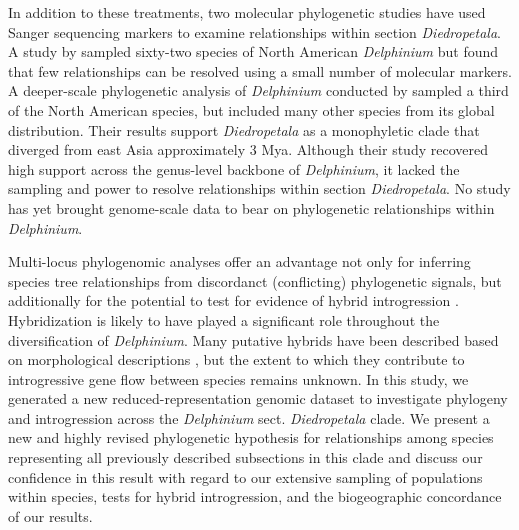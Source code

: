 \documentclass[11pt]{article}
\begin{document}
In addition to these treatments, two molecular phylogenetic studies have used
Sanger sequencing markers to examine relationships within section \emph{Diedropetala}.
% 
A study by \citet{koontz_using_2004} sampled sixty-two species of 
North American \emph{Delphinium} but found that few relationships can
be resolved using a small number of molecular markers. 
% 
A deeper-scale phylogenetic analysis of \emph{Delphinium} conducted
by \cite{jabbour_phylogeny_2012} sampled a third of the North American species,
but included many other species from its global distribution.
Their results support \emph{Diedropetala} as a monophyletic clade that diverged
from east Asia approximately 3 Mya.
% 
Although their study recovered high support across the genus-level 
backbone of \emph{Delphinium}, it lacked the sampling and power to 
resolve relationships within section \emph{Diedropetala}.
% 
No study has yet brought genome-scale data to bear on phylogenetic 
relationships within \emph{Delphinium}.


Multi-locus phylogenomic analyses offer an advantage not only for inferring
species tree relationships from discordanct (conflicting) phylogenetic signals, 
but additionally for the potential to test for evidence of hybrid introgression
\citep{kubatko_species_2023}.
% 
Hybridization is likely to have played a significant role throughout the 
diversification of \emph{Delphinium}. 
Many putative hybrids have been described based on morphological descriptions 
\citep{ewan_synopsis_1945, warnock_taxonomic_1995, legro_species_1961, koontz_hybrid_2001},
but the extent to which they contribute to introgressive gene 
flow between species remains unknown.
% 
% 
In this study, we generated a new reduced-representation genomic dataset to 
investigate phylogeny and introgression across the \emph{Delphinium} sect. 
\emph{Diedropetala} clade. 
% 
We present a new and highly revised phylogenetic hypothesis for relationships
among species representing all previously described subsections in this clade 
and discuss our confidence in this result with regard to our 
extensive sampling of populations within species, tests for hybrid 
introgression, and the biogeographic concordance of our results.
\end{document}

